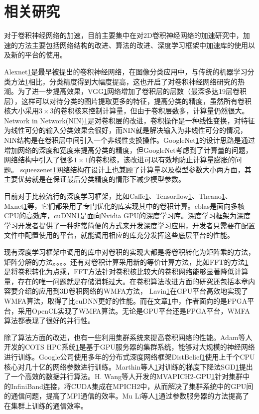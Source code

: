 \section{相关研究}
对于卷积神经网络的加速，目前主要集中在对2D卷积神经网络的加速研究中，加速的方法主要包括网络结构的改进、算法的改进、深度学习框架中加速库的使用以及新的平台的使用。

Alexnet\ref{}是最早被提出的卷积神经网络，在图像分类应用中，与传统的机器学习分类方法\ref{}相比，分类精度得到大幅度提高，这也开启了对卷积神经网络研究的热潮。为了进一步提高效果，VGG\ref{}网络增加了卷积层的层数（最深多达19层卷积层），这样可以对待分类的图片提取更多的特征，提高分类的精度，虽然所有卷积核大小采用$3\times 3$的卷积核来控制计算量，但由于卷积层数多，计算量仍然很大。Network in Network(NIN)\ref{}是对卷积层的改进，卷积操作是一种线性变换，对特征为线性可分的输入分类效果会很好，而NIN就是解决输入为非线性可分的情况，NIN结构是在卷积层中间引入一个非线性变换操作。GoogleNet\ref{}的设计思路是通过增加网络的深度和宽度来提高分类的精度，但GoogleNet考虑到了计算量的问题，网络结构中引入了很多$1\times 1$的卷积核，该改进可以有效地防止计算量膨胀的问题。 squeezenet\ref{}网络结构在设计上也兼顾了计算量以及模型参数大小两方面，其主要优势就是在保证最后分类精度的情形下减少模型参数。

目前对于比较流行的深度学习框架，比如Caffe\ref{}、Tensorflow\ref{}、Theano\ref{}、Mxnet\ref{}等，它们都采用了专门优化的库实现其中的卷积计算。cblas是面向多核CPU的高效库，cuDNN\ref{}是面向Nvidia GPU的深度学习库。深度学习框架为深度学习开发者提供了一种非常简便的方式来开发深度学习应用，开发者只需要在配置文件中配置使用的平台，就能调用相应的库充分发挥这些底层平台的性能。

现有深度学习框架中调用的库中对卷积的实现大都是将卷积转化为矩阵乘的方法，矩阵分解的方法。。。。还有对卷积计算采用新的等价计算方法，比如FFT的方法\ref{}是将卷积转化为点乘，FFT方法针对卷积核比较大的卷积网络能够显著降低计算量，存在的唯一问题就是存储消耗过大。在卷积算法改进方面的研究还包括本章内容要介绍的应用到3D卷积网络的WMFA方法， Lavin\ref{}在GPU平台高效地实现了WMFA算法，取得了比cuDNN更好的性能。而在文章\ref{}中，作者面向的是FPGA平台，采用OpenCL实现了WMFA算法。无论是GPU平台还是FPGA平台，WMFA算法都表现了很好的并行性。

除了算法方面的改进，也有一些利用集群系统来提高卷积网络的性能。Adam等人开发的COTS HPC系统\ref{}是基于GPU服务器的集群系统，能够对大规模的神经网络进行训练。Google公司使用多年的分布式深度网络框架DistBelief\ref{}使用上千个CPU核心对几十亿的网络参数进行训练。Marthin等人\ref{}对训练的梯度下降法SGD\ref{}提出了一个高效的数据并行算法。H. Wang等人开发的MVAPICH2-GPU\ref{}针对集群中的InfiniBand连接，将CUDA集成在MPICH2中，从而解决了集群系统中的GPU间的通信问题，提高了MPI通信的效率。Mu Li等人\ref{}通过参数服务器的方法提高了在集群上训练的通信效率。

